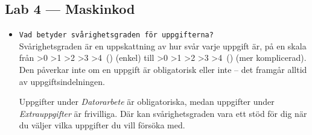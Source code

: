 \documentclass[fleqn, article, a4paper]{memoir}
\newcommand{\stars}[1]{%
  \ifnum#1>0 \ding{72}\else \ding{73}\fi
  \ifnum#1>1 \ding{72}\else \ding{73}\fi
  \ifnum#1>2 \ding{72}\else \ding{73}\fi
  \ifnum#1>3 \ding{72}\else \ding{73}\fi
  \ifnum#1>4 \ding{72}\else \ding{73}\fi
}
\newcommand{\diffinline}[2][]{%
  \stars{#2}%
  \ifx\relax#1\relax \else \,(\textit{#1})\fi
}
\begin{document}
\subsection{Lab 4 --- Maskinkod}
\begin{itemize}
    \item \texttt{Vad betyder svårighetsgraden för uppgifterna?}\\
          Svårighetsgraden är en uppskattning av hur svår varje uppgift är, på en skala från \diffinline{1} (enkel) till \diffinline{5} (mer komplicerad). Den påverkar inte om en uppgift är obligatorisk eller inte -- det framgår alltid av uppgiftsindelningen. 

          Uppgifter under \emph{Datorarbete} är obligatoriska, medan uppgifter under \emph{Extrauppgifter} är frivilliga. Där kan svårighetsgraden vara ett stöd för dig när du väljer vilka uppgifter du vill försöka med.
\end{itemize}



\newpage


\newpage


\newpage


\newpage


\newpage






\end{document}
